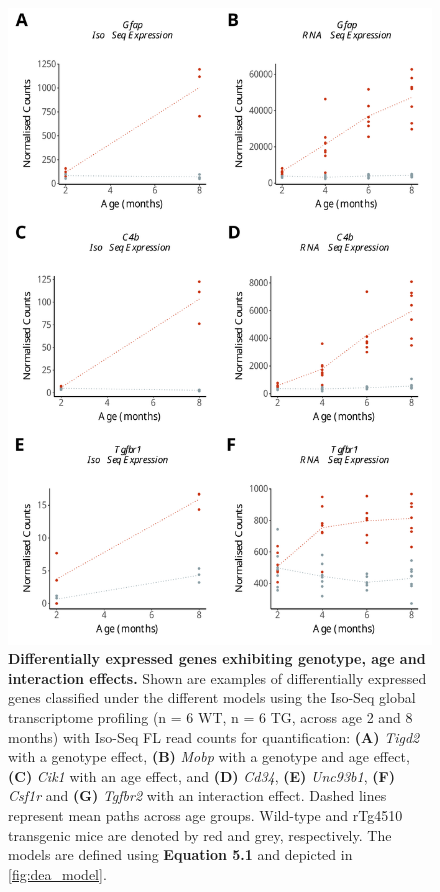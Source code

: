 \begin{figure}[h]
	\centering
	\includegraphics[page=5,scale = 0.55]{Figures/WholeDifferentialAnalysis.pdf}
	\captionsetup{width=0.95\textwidth}
	\caption[Examples of differential expression associated with genotype, age \& interaction effects]%
	{\textbf{Differentially expressed genes exhibiting genotype, age and interaction effects.} Shown are examples of differentially expressed genes classified under the different models using the Iso-Seq global transcriptome profiling (n = 6 WT, n = 6 TG, across age 2 and 8 months) with Iso-Seq FL read counts for quantification: \textbf{(A)} \textit{Tigd2} with a genotype effect, \textbf{(B)} \textit{Mobp} with a genotype and age effect, \textbf{(C)} \textit{Cik1} with an age effect, and \textbf{(D)} \textit{Cd34}, \textbf{(E)} \textit{Unc93b1}, \textbf{(F)} \textit{Csf1r} and \textbf{(G)} \textit{Tgfbr2} with an interaction effect. Dashed lines represent mean paths across age groups. Wild-type and rTg4510 transgenic mice are denoted by red and grey, respectively. The models are defined using \textbf{Equation 5.1} and depicted in \cref{fig:dea_model}.}   
	\label{fig:dea_model_genexp}
\end{figure}
 
